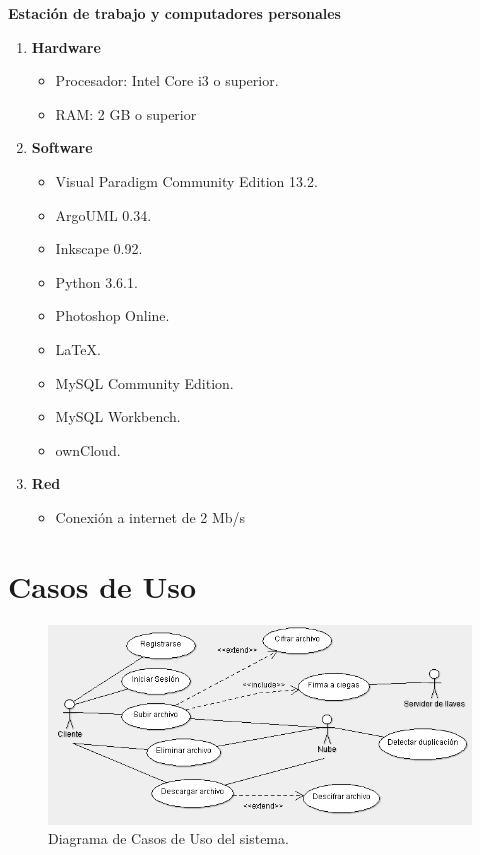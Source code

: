 \textbf{Estación de trabajo y computadores personales}
\begin{enumerate}
\item \textbf{Hardware}
\begin{itemize}
\item Procesador: Intel Core i3 o superior.
\item RAM: 2 GB o superior
\end{itemize}
\item \textbf{Software}
\begin{itemize}
\item Visual Paradigm Community Edition 13.2.
\item ArgoUML 0.34.
\item Inkscape 0.92.
\item Python 3.6.1.
\item Photoshop Online.
\item LaTeX.
\item MySQL Community Edition.
\item MySQL Workbench.
\item ownCloud.
\end{itemize}
\item \textbf{Red}
\begin{itemize}
\item Conexión a internet de 2 Mb/s
\end{itemize}
\end{enumerate}

\section{Casos de Uso}

\begin{figure}[htbp!]
		\centering
			\includegraphics[width=1\textwidth]{images/CasosDeUso}
		\caption{Diagrama de Casos de Uso del sistema.}
	\end{figure}

